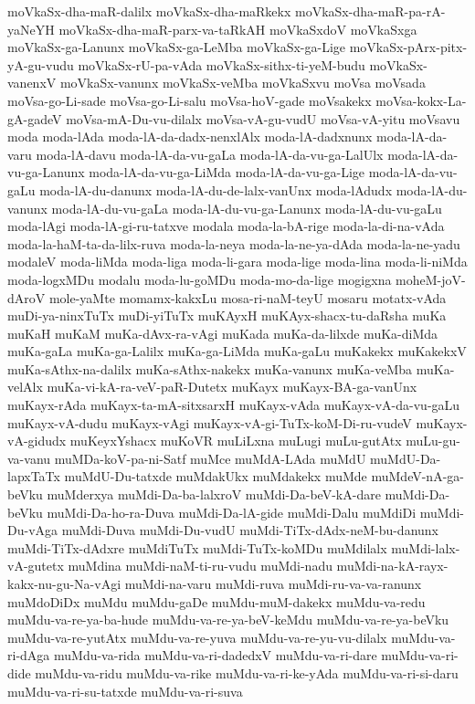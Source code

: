 {moVkaSx-dha-maR-dalilx
moVkaSx-dha-maRkekx
moVkaSx-dha-maR-pa-rA-yaNeYH
moVkaSx-dha-maR-parx-va-taRkAH
moVkaSxdoV
moVkaSxga
moVkaSx-ga-Lanunx
moVkaSx-ga-LeMba
moVkaSx-ga-Lige
moVkaSx-pArx-pitx-yA-gu-vudu
moVkaSx-rU-pa-vAda
moVkaSx-sithx-ti-yeM-budu
moVkaSx-vanenxV
moVkaSx-vanunx
moVkaSx-veMba
moVkaSxvu
moVsa
moVsada
moVsa-go-Li-sade
moVsa-go-Li-salu
moVsa-hoV-gade
moVsakekx
moVsa-kokx-La-gA-gadeV
moVsa-mA-Du-vu-dilalx
moVsa-vA-gu-vudU
moVsa-vA-yitu
moVsavu
moda
moda-lAda
moda-lA-da-dadx-nenxlAlx
moda-lA-dadxnunx
moda-lA-da-varu
moda-lA-davu
moda-lA-da-vu-gaLa
moda-lA-da-vu-ga-LalUlx
moda-lA-da-vu-ga-Lanunx
moda-lA-da-vu-ga-LiMda
moda-lA-da-vu-ga-Lige
moda-lA-da-vu-gaLu
moda-lA-du-danunx
moda-lA-du-de-lalx-vanUnx
moda-lAdudx
moda-lA-du-vanunx
moda-lA-du-vu-gaLa
moda-lA-du-vu-ga-Lanunx
moda-lA-du-vu-gaLu
moda-lAgi
moda-lA-gi-ru-tatxve
modala
moda-la-bA-rige
moda-la-di-na-vAda
moda-la-haM-ta-da-lilx-ruva
moda-la-neya
moda-la-ne-ya-dAda
moda-la-ne-yadu
modaleV
moda-liMda
moda-liga
moda-li-gara
moda-lige
moda-lina
moda-li-niMda
moda-logxMDu
modalu
moda-lu-goMDu
moda-mo-da-lige
mogigxna
moheM-joV-dAroV
mole-yaMte
momamx-kakxLu
mosa-ri-naM-teyU
mosaru
motatx-vAda
muDi-ya-ninxTuTx
muDi-yiTuTx
muKAyxH
muKAyx-shacx-tu-daRsha
muKa
muKaH
muKaM
muKa-dAvx-ra-vAgi
muKada
muKa-da-lilxde
muKa-diMda
muKa-gaLa
muKa-ga-Lalilx
muKa-ga-LiMda
muKa-gaLu
muKakekx
muKakekxV
muKa-sAthx-na-dalilx
muKa-sAthx-nakekx
muKa-vanunx
muKa-veMba
muKa-velAlx
muKa-vi-kA-ra-veV-paR-Dutetx
muKayx
muKayx-BA-ga-vanUnx
muKayx-rAda
muKayx-ta-mA-sitxsarxH
muKayx-vAda
muKayx-vA-da-vu-gaLu
muKayx-vA-dudu
muKayx-vAgi
muKayx-vA-gi-TuTx-koM-Di-ru-vudeV
muKayx-vA-gidudx
muKeyxYshacx
muKoVR
muLiLxna
muLugi
muLu-gutAtx
muLu-gu-va-vanu
muMDa-koV-pa-ni-Satf
muMce
muMdA-LAda
muMdU
muMdU-Da-lapxTaTx
muMdU-Du-tatxde
muMdakUkx
muMdakekx
muMde
muMdeV-nA-ga-beVku
muMderxya
muMdi-Da-ba-lalxroV
muMdi-Da-beV-kA-dare
muMdi-Da-beVku
muMdi-Da-ho-ra-Duva
muMdi-Da-lA-gide
muMdi-Dalu
muMdiDi
muMdi-Du-vAga
muMdi-Duva
muMdi-Du-vudU
muMdi-TiTx-dAdx-neM-bu-danunx
muMdi-TiTx-dAdxre
muMdiTuTx
muMdi-TuTx-koMDu
muMdilalx
muMdi-lalx-vA-gutetx
muMdina
muMdi-naM-ti-ru-vudu
muMdi-nadu
muMdi-na-kA-rayx-kakx-nu-gu-Na-vAgi
muMdi-na-varu
muMdi-ruva
muMdi-ru-va-va-ranunx
muMdoDiDx
muMdu
muMdu-gaDe
muMdu-muM-dakekx
muMdu-va-redu
muMdu-va-re-ya-ba-hude
muMdu-va-re-ya-beV-keMdu
muMdu-va-re-ya-beVku
muMdu-va-re-yutAtx
muMdu-va-re-yuva
muMdu-va-re-yu-vu-dilalx
muMdu-va-ri-dAga
muMdu-va-rida
muMdu-va-ri-dadedxV
muMdu-va-ri-dare
muMdu-va-ri-dide
muMdu-va-ridu
muMdu-va-rike
muMdu-va-ri-ke-yAda
muMdu-va-ri-si-daru
muMdu-va-ri-su-tatxde
muMdu-va-ri-suva
}
